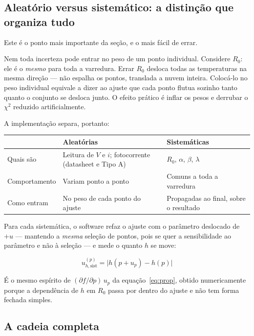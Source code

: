 \documentclass[11pt,a4paper]{article}
\begin{document}
\subsection{Aleatório versus sistemático: a distinção que organiza tudo}

Este é o ponto mais importante da seção, e o mais fácil de errar.

Nem toda incerteza pode entrar no peso de um ponto individual. Considere $R_0$:
ele é o \emph{mesmo} para toda a varredura. Errar $R_0$ desloca todas as
temperaturas na mesma direção --- não espalha os pontos, translada a nuvem
inteira. Colocá-lo no peso individual equivale a dizer ao ajuste que cada ponto
flutua sozinho tanto quanto o conjunto se desloca junto. O efeito prático é
inflar os pesos e derrubar o $\chi^2$ reduzido artificialmente.

A implementação separa, portanto:

\begin{center}
\begin{tabular}{@{}p{3.4cm}p{5.2cm}p{5.6cm}@{}}
\toprule
& \textbf{Aleatórias} & \textbf{Sistemáticas} \\
\midrule
Quais são &
Leitura de $V$ e $i$; fotocorrente (datasheet e Tipo A) &
$R_0$, $\alpha$, $\beta$, $\lambda$ \\[0.4em]
Comportamento &
Variam ponto a ponto &
Comuns a toda a varredura \\[0.4em]
Como entram &
No peso de cada ponto do ajuste &
Propagadas ao final, sobre o resultado \\
\bottomrule
\end{tabular}
\end{center}

Para cada sistemática, o software refaz o ajuste com o parâmetro deslocado de
$+u$ --- mantendo a \emph{mesma} seleção de pontos, pois se quer a
sensibilidade ao parâmetro e não à seleção --- e mede o quanto $h$ se move:

\begin{equation}
  u_{h,\text{sist}}^{(p)} = \bigl| h(p + u_p) - h(p) \bigr|
  \label{eq:sensibilidade}
\end{equation}

É o mesmo espírito de $(\partial f/\partial p)\,u_p$ da equação~\eqref{eq:prop},
obtido numericamente porque a dependência de $h$ em $R_0$ passa por dentro do
ajuste e não tem forma fechada simples.

\subsection{A cadeia completa}
\end{document}
